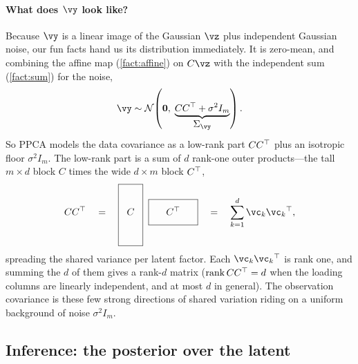 \documentclass[11pt]{article}
\theoremstyle{plain}
\theoremstyle{definition}
\theoremstyle{remark}
\theoremstyle{definition}
\newcommand{\Normal}{\mathcal{N}}
\DeclareMathOperator{\rank}{rank}
\begin{document}
\paragraph{What does $\vy$ look like?}
Because $\vy$ is a linear image of the Gaussian $\vz$ plus independent Gaussian
noise, our fun facts hand us its distribution immediately. It is zero-mean, and
combining the affine map (\cref{fact:affine}) on $C\vz$ with the independent sum
(\cref{fact:sum}) for the noise,
\begin{equation}\label{eq:ppca-marginal}
    \vy \sim \Normal\!\left(\mathbf 0,\; \underbrace{C C\trp + \sigma^2 I_m}_{\displaystyle \Sigma_{\vy}}\right).
\end{equation}
So PPCA models the data covariance as a low-rank part $C C{^\top}$ plus an isotropic
floor $\sigma^2 I_m$. The low-rank part is a sum of $d$ rank-one outer
products---the tall $m \times d$ block $C$ times the wide $d \times m$ block
$C{^\top}$,
\begin{equation}\label{eq:ppca-lowrank}
    C C\trp \quad=\quad
    \framebox[0.9cm]{\raisebox{0pt}[1.0cm][1.0cm]{$C$}}
    \;\;
    \framebox[1.8cm]{\raisebox{0mm}[4.5mm][2.5mm]{$C\trp$}}
    \quad=\quad \sum_{k=1}^d \vc_k \vc_k\trp ,
\end{equation}
spreading the shared variance per latent factor. Each $\vc_k \vc_k\trp$ is rank
one, and summing the $d$ of them gives a rank-$d$ matrix ($\rank C C\trp = d$
when the loading columns are linearly independent, and at most $d$ in general).
The observation covariance is these few strong directions of shared variation
riding on a uniform background of noise $\sigma^2 I_m$.

\subsection{Inference: the posterior over the latent}
\end{document}
